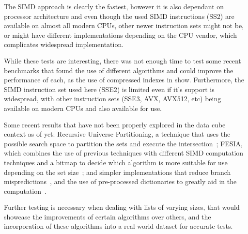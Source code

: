 The SIMD approach is clearly the fastest, however it is also dependant on processor architecture and even though the used SIMD instructions (SS2) are available on almost all modern CPUs, other newer instruction sets might not be, or might have different implementations depending on the CPU vendor, which complicates widespread implementation.

While these tests are interesting, there was not enough time to test some recent benchmarks that found the use of different algorithms and could improve the performance of each, as the use of compressed indexes in \cite{pibiriTechniquesInvertedIndex2019} show.
Furthermore, the SIMD instruction set used here (SSE2) is limited even if it's support is widespread, with other instruction sets (SSE3, AVX, AVX512, etc) being available on modern CPUs and also available for use.

Some recent results that have not been properly explored in the data cube context as of yet: Recursive Universe Partitioning, a technique that uses the possible search space to partition the sets and execute the intersection~\cite{pibiriFastCompactSet2021}; FESIA, which combines the use of previous techniques with different SIMD computation techniques and a bitmap to decide which algorithm is more suitable for use depending on the set size~\cite{zhangFESIAFastSIMDEfficient2020}; and simpler implementations that reduce branch mispredictions~\cite{inoueFasterSetIntersection2014}, and the use of pre-processed dictionaries to greatly aid in the computation~\cite{dingFastSetIntersection2011a}.

Further testing is necessary when dealing with lists of varying sizes, that would showcase the improvements of certain algorithms over others, and the incorporation of these algorithms into a real-world dataset for accurate tests.

